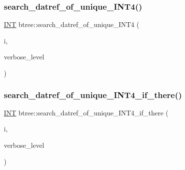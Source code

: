 \subsubsection{\texorpdfstring{search\+\_\+datref\+\_\+of\+\_\+unique\+\_\+\+I\+N\+T4()}{search\_datref\_of\_unique\_INT4()}}
{\footnotesize\ttfamily \mbox{\hyperlink{galois_8h_a09fddde158a3a20bd2dcadb609de11dc}{I\+NT}} btree\+::search\+\_\+datref\+\_\+of\+\_\+unique\+\_\+\+I\+N\+T4 (\begin{DoxyParamCaption}\item[{\mbox{\hyperlink{galois_8h_a09fddde158a3a20bd2dcadb609de11dc}{I\+NT}}}]{i,  }\item[{\mbox{\hyperlink{galois_8h_a09fddde158a3a20bd2dcadb609de11dc}{I\+NT}}}]{verbose\+\_\+level }\end{DoxyParamCaption})}

\mbox{\label{classbtree_afceff3e8dd827e4d687e2a82bed46256}} 
\subsubsection{\texorpdfstring{search\+\_\+datref\+\_\+of\+\_\+unique\+\_\+\+I\+N\+T4\+\_\+if\+\_\+there()}{search\_datref\_of\_unique\_INT4\_if\_there()}}
{\footnotesize\ttfamily \mbox{\hyperlink{galois_8h_a09fddde158a3a20bd2dcadb609de11dc}{I\+NT}} btree\+::search\+\_\+datref\+\_\+of\+\_\+unique\+\_\+\+I\+N\+T4\+\_\+if\+\_\+there (\begin{DoxyParamCaption}\item[{\mbox{\hyperlink{galois_8h_a09fddde158a3a20bd2dcadb609de11dc}{I\+NT}}}]{i,  }\item[{\mbox{\hyperlink{galois_8h_a09fddde158a3a20bd2dcadb609de11dc}{I\+NT}}}]{verbose\+\_\+level }\end{DoxyParamCaption})}

\mbox{\label{classbtree_a8746bb2cda91692ba57e9a72dde59a23}} 
